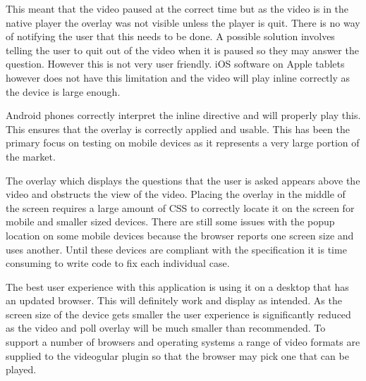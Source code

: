 This meant that the video paused at the correct time but as the video is in the native player the overlay was not visible unless the player is quit. There is no way of notifying the user that this needs to be done. A possible solution involves telling the user to quit out of the video when it is paused so they may answer the question. However this is not very user friendly. iOS software on Apple tablets however does not have this limitation and the video will play inline correctly as the device is large enough.

Android phones correctly interpret the inline directive and will properly play this. This ensures that the overlay is correctly applied and usable. This has been the primary focus on testing on mobile devices as it represents a very large portion of the market.

The overlay which displays the questions that the user is asked appears above the video and obstructs the view of the video. Placing the overlay in the middle of the screen requires a large amount of CSS to correctly locate it on the screen for mobile and smaller sized devices. There are still some issues with the popup location on some mobile devices because the browser reports one screen size and uses another. Until these devices are compliant with the specification it is time consuming to write code to fix each individual case.

The best user experience with this application is using it on a desktop that has an updated browser. This will definitely work and display as intended. As the screen size of the device gets smaller the user experience is significantly reduced as the video and poll overlay will be much smaller than recommended. To support a number of browsers and operating systems a range of video formats are supplied to the videogular plugin so that the browser may pick one that can be played.